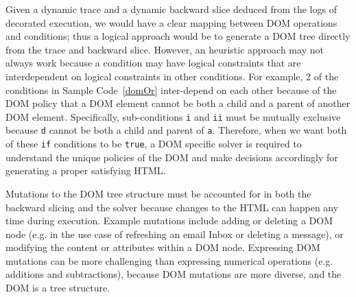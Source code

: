 Given a dynamic trace and a dynamic backward slice deduced from the logs of decorated execution, we would have a clear mapping between DOM operations and conditions; thus a logical approach would be to generate a DOM tree directly from the trace and backward slice.  
However, an heuristic approach may not always work because a condition may have logical constraints that are interdependent on logical constraints in other conditions.  
For example, 2 of the conditions in Sample Code~\ref{domOr} inter-depend on each other because of the DOM policy that a DOM element cannot be both a child and a parent of another DOM element.  
Specifically, sub-conditions {\tt i} and {\tt ii} must be mutually exclusive because {\tt d} cannot be both a child and parent of {\tt a}.
Therefore, when we want both of these {\tt if} conditions to be {\tt true}, a DOM specific solver is required to understand the unique policies of the DOM and make decisions accordingly for generating a proper satisfying HTML.

Mutations to the DOM tree structure must be accounted for in both the backward slicing and the solver because changes to the HTML can happen any time during execution.
Example mutations include adding or deleting a DOM node (e.g. in the use case of refreshing an email Inbox or deleting a message), or modifying the content or attributes within a DOM node.  
Expressing DOM mutations can be more challenging than expressing numerical operations (e.g. additions and subtractions), because DOM mutations are more diverse, and the DOM is a tree structure.
